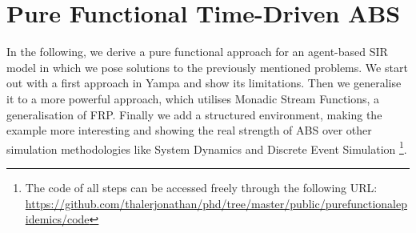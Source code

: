 \chapter{Pure Functional Time-Driven ABS}
\label{ch:timedriven}

In the following, we derive a pure functional approach for an agent-based SIR model in which we pose solutions to the previously mentioned problems. We start out with a first approach in Yampa and show its limitations. Then we generalise it to a more powerful approach, which utilises Monadic Stream Functions, a generalisation of FRP. Finally we add a structured environment, making the example more interesting and showing the real strength of ABS over other simulation methodologies like System Dynamics and Discrete Event Simulation \footnote{The code of all steps can be accessed freely through the following URL: \url{https://github.com/thalerjonathan/phd/tree/master/public/purefunctionalepidemics/code}}.









